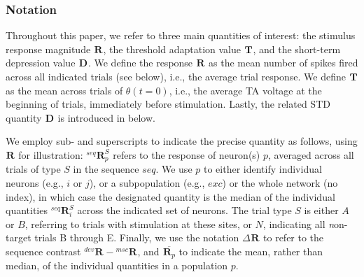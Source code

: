\documentclass[9pt,lineno,onehalfspacing]{elife}
\newcommand{\R}[3][]{{}^{#1}_{}\boldsymbol R^{#2}_{#3}}
\newcommand{\T}[3][]{{}^{#1}_{}\boldsymbol T^{#2}_{#3}}
\newcommand{\D}[3][]{{}^{#1}_{}\boldsymbol D^{#2}_{#3}}
\newcommand{\mean}[1]{\overline{#1}}
\begin{document}
\subsubsection{Notation}
Throughout this paper, we refer to three main quantities of interest: the stimulus response magnitude $\R{}{}$, the threshold adaptation value $\T{}{}$, and the short-term depression value $\D{}{}$. We define the response $\R{}{}$ as the mean number of spikes fired across all indicated trials (see below), i.e., the average trial response. We define $\T{}{}$ as the mean across trials of $\theta(t=0)$, i.e., the average TA voltage at the beginning of trials, immediately before stimulation. Lastly, the related STD quantity $\D{}{}$ is introduced in  below.

We employ sub- and superscripts to indicate the precise quantity as follows, using $\R{}{}$ for illustration: $\R[seq]{S}{p}$ refers to the response of neuron(s) $p$, averaged across all trials of type $S$ in the sequence $seq$. We use $p$ to either identify individual neurons (e.g., $i$ or $j$), or a subpopulation (e.g., $exc$) or the whole network (no index), in which case the designated quantity is the median of the individual quantities $\R[seq]{S}{i}$ across the indicated set of neurons. The trial type $S$ is either $A$ or $B$, referring to trials with stimulation at these sites, or $N$, indicating all \textit{n}on-target trials B through E. Finally, we use the notation $\Delta \R{}{}$ to refer to the sequence contrast $\R[dev]{}{} - \R[msc]{}{}$, and $\mean{\R{}{p}}$ to indicate the mean, rather than median, of the individual quantities in a population $p$.
\end{document}
